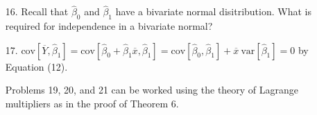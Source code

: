 \begin{enumerate}
	\newpage
	\item[16.] Recall that $\hat{\beta}_0$ and $\hat{\beta}_1$ have a bivariate normal disitribution. What is required for independence in a bivariate normal?
	
	\item[17.] $\mbox{cov}[\overline{Y},\hat{\beta}_1] = \mbox{cov}[\hat{\beta}_0+\hat{\beta}_1\overline{x}, \hat{\beta}_1] = \mbox{cov}[\hat{\beta}_0, \hat{\beta}_1] + \overline{x}\ \mbox{var}[\hat{\beta}_1] = 0$ by Equation (12). 
	
	Problems 19, 20, and 21 can be worked using the theory of Lagrange multipliers as in the proof of Theorem 6.

\end{enumerate}

